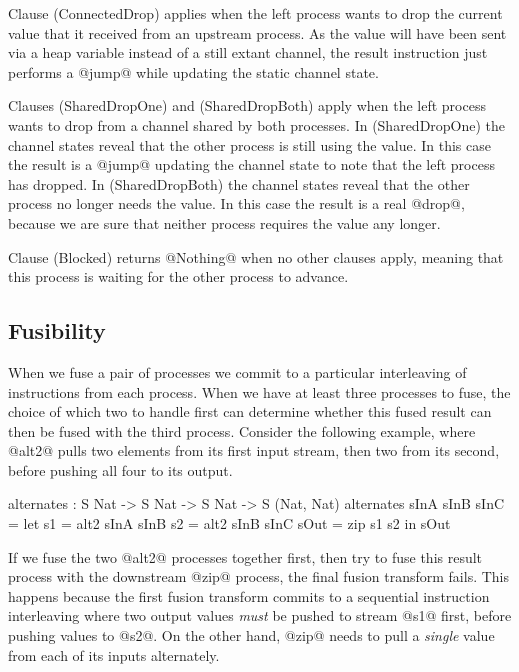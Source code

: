 Clause (ConnectedDrop) applies when the left process wants to drop the current value that it received from an upstream process. As the value will have been sent via a heap variable instead of a still extant channel, the result instruction just performs a @jump@ while updating the static channel state.

Clauses (SharedDropOne) and (SharedDropBoth) apply when the left process wants to drop from a channel shared by both processes. In (SharedDropOne) the channel states reveal that the other process is still using the value. In this case the result is a @jump@ updating the channel state to note that the left process has dropped. In (SharedDropBoth) the channel states reveal that the other process no longer needs the value. In this case the result is a real @drop@, because we are sure that neither process requires the value any longer.

Clause (Blocked) returns @Nothing@ when no other clauses apply, meaning that this process is waiting for the other process to advance.







\subsection{Fusibility}
\label{s:FusionOrder}
When we fuse a pair of processes we commit to a particular interleaving of instructions from each process. When we have at least three processes to fuse, the choice of which two to handle first can determine whether this fused result can then be fused with the third process. Consider the following example, where @alt2@ pulls two elements from its first input stream, then two from its second, before pushing all four to its output.
\begin{code}
 alternates : S Nat -> S Nat -> S Nat -> S (Nat, Nat)
 alternates sInA sInB sInC
  = let  s1   = alt2 sInA sInB
         s2   = alt2 sInB sInC
         sOut = zip s1 s2
    in   sOut
\end{code}
If we fuse the two @alt2@ processes together first, then try to fuse this result process with the downstream @zip@ process, the final fusion transform fails. This happens because the first fusion transform commits to a sequential instruction interleaving where two output values \emph{must} be pushed to stream @s1@ first, before pushing values to @s2@. On the other hand, @zip@ needs to pull a \emph{single} value from each of its inputs alternately.

